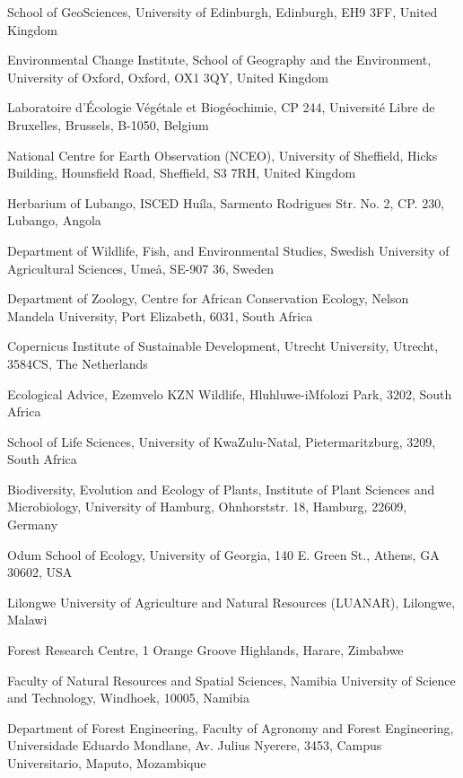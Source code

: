 \begin{refsection}
\begin{paperaffil}
\item{School of GeoSciences, University of Edinburgh, Edinburgh, EH9 3FF, United Kingdom}
\item{Environmental Change Institute, School of Geography and the Environment, University of Oxford, Oxford, OX1 3QY, United Kingdom}
\item{Laboratoire d'\'{E}cologie V\'{e}g\'{e}tale et Biogéochimie, CP 244, Universit\'{e} Libre de Bruxelles, Brussels, B-1050, Belgium}
\item{National Centre for Earth Observation (NCEO), University of Sheffield, Hicks Building, Hounsfield Road, Sheffield, S3 7RH, United Kingdom}
\item{Herbarium of Lubango, ISCED Hu\'{i}la, Sarmento Rodrigues Str. No. 2, CP. 230, Lubango, Angola}
\item{Department of Wildlife, Fish, and Environmental Studies, Swedish University of Agricultural Sciences, Ume\aa, SE-907 36, Sweden}
\item{Department of Zoology, Centre for African Conservation Ecology, Nelson Mandela University, Port Elizabeth, 6031, South Africa}
\item{Copernicus Institute of Sustainable Development, Utrecht University, Utrecht, 3584CS, The Netherlands}
\item{Ecological Advice, Ezemvelo KZN Wildlife, Hluhluwe-iMfolozi Park, 3202, South Africa}
\item{School of Life Sciences, University of KwaZulu-Natal, Pietermaritzburg, 3209, South Africa}
\item{Biodiversity, Evolution and Ecology of Plants, Institute of Plant Sciences and Microbiology, University of Hamburg, Ohnhorststr. 18, Hamburg, 22609, Germany}
\item{Odum School of Ecology, University of Georgia, 140 E. Green St., Athens, GA 30602, USA}
\item{Lilongwe University of Agriculture and Natural Resources (LUANAR), Lilongwe, Malawi}
\item{Forest Research Centre, 1 Orange Groove Highlands, Harare, Zimbabwe}
\item{Faculty of Natural Resources and Spatial Sciences, Namibia University of Science and Technology, Windhoek, 10005, Namibia}
\item{Department of Forest Engineering, Faculty of Agronomy and Forest Engineering, Universidade Eduardo Mondlane, Av. Julius Nyerere, 3453, Campus Universitario, Maputo, Mozambique}

\end{paperaffil}
\end{refsection}
